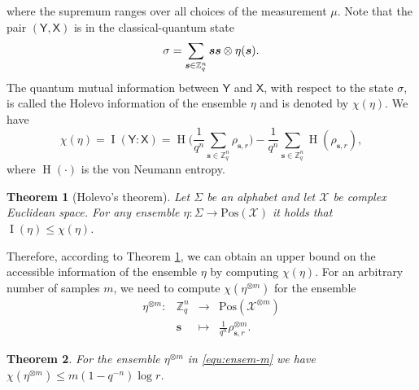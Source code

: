 \documentclass[11pt]{article}
\theoremstyle{plain}
\newtheorem{theorem}{Theorem}
\theoremstyle{definition}
\DeclareMathOperator{\entpy}{H}
\let\ket\relax
\DeclarePairedDelimiter{\ket}{\lvert}{\rangle}
\let\bra\relax
\DeclarePairedDelimiter{\bra}{\langle}{\rvert}
\def\Z{\mathbb{Z}}
\def\X{\mathcal{X}}
\begin{document}
where the supremum ranges over all choices of the measurement $\mu$. Note that the pair $(\mathsf{Y}, \mathsf{X})$ is in the classical-quantum state
\[ \sigma = \sum_{\bm{s} \in \Z_q^n} \ket{\bm{s}}\bra{\bm{s}} \otimes \eta(\bm{s}). \]
The quantum mutual information between $\mathsf{Y}$ and $\mathsf{X}$, with respect to the state $\sigma$, is called the Holevo information of the ensemble $\eta$ and is denoted by $\chi(\eta)$. We have
\begin{equation}
    \label{equ:holevo-chi}
    \chi(\eta) = \operatorname{I}(\mathsf{Y} : \mathsf{X}) = \entpy\Bigg( \frac{1}{q^n} \sum_{\bm{s} \in \Z_q^n} \rho_{\bm{s}, r} \Bigg) - \frac{1}{q^n} \sum_{\bm{s} \in \Z_q^n} \entpy(\rho_{\bm{s}, r}),
\end{equation}
where $\entpy(\cdot)$ is the von Neumann entropy.
\begin{theorem}[Holevo's theorem]
    \label{thm:holevo}
    Let $\Sigma$ be an alphabet and let $\X$ be complex Euclidean space. For any ensemble $\eta: \Sigma \rightarrow \mathrm{Pos}(\X)$ it holds that $\operatorname{I}(\eta) \le \chi(\eta)$.
\end{theorem}
Therefore, according to Theorem \ref{thm:holevo}, we can obtain an upper bound on the accessible information of the ensemble $\eta$ by computing $\chi(\eta)$. For an arbitrary number of samples $m$, we need to compute $\chi(\eta^{\otimes m})$ for the ensemble
\begin{equation}
    \label{equ:ensem-m}
    \begin{array}{rrll}
        \eta^{\otimes m}: & \Z_q^n & \longrightarrow & \mathrm{Pos}(\X^{\otimes m}) \\
        & \bm{s} & \longmapsto & \frac{1}{q^n}\rho_{\bm{s}, r}^{\otimes m}.
    \end{array}
\end{equation}
\begin{theorem}
    \label{thm:acc-bound}
    For the ensemble $\eta^{\otimes m}$ in \eqref{equ:ensem-m} we have $\chi(\eta^{\otimes m}) \le m(1 - q^{-n})\log r$.
\end{theorem}
\end{document}
